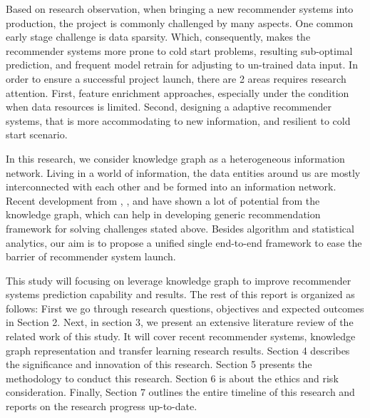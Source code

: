 Based on research observation, when bringing a new recommender systems into production, the project is commonly challenged by many aspects. One common early stage challenge is data sparsity. Which, consequently, makes the recommender systems more prone to cold start problems, resulting sub-optimal prediction, and frequent model retrain for adjusting to un-trained data input. In order to ensure a successful project launch, there are 2 areas requires research attention. First, feature enrichment approaches, especially under the condition when data resources is limited. Second, designing a adaptive recommender systems, that is more accommodating to new information, and resilient to cold start scenario. 

In this research, we consider knowledge graph as a heterogeneous information network. Living in a world of information, the data entities around us are mostly interconnected with each other and be formed into an information network. Recent development from \citet{qin2020survey}, \citet{wang2018ripplenet}, and \citet{xi2020graph} have shown a lot of potential from the knowledge graph, which can help in developing generic recommendation framework for solving challenges stated above. Besides algorithm and statistical analytics, our aim is to propose a unified single end-to-end framework to ease the barrier of recommender system launch.


This study will focusing on leverage knowledge graph to improve recommender systems prediction capability and results. The rest of this report is organized as follows: 
First we go through research questions, objectives and expected outcomes in Section 2. Next, in section 3, we present an extensive literature review of the related work of this study. It will cover recent recommender systems, knowledge graph representation and transfer learning research results. Section 4 describes the significance and innovation of this research. Section 5 presents the methodology to conduct this research. Section 6 is about the ethics and risk consideration. Finally, Section 7 outlines the entire timeline of this research and reports on the research progress up-to-date.


